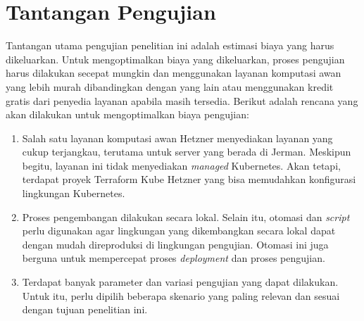 \section{Tantangan Pengujian}

Tantangan utama pengujian penelitian ini adalah estimasi biaya yang harus dikeluarkan. Untuk mengoptimalkan biaya yang dikeluarkan, proses pengujian harus dilakukan secepat mungkin dan menggunakan layanan komputasi awan yang lebih murah dibandingkan dengan yang lain atau menggunakan kredit gratis dari penyedia layanan apabila masih tersedia. Berikut adalah rencana yang akan dilakukan untuk mengoptimalkan biaya pengujian:

\begin{enumerate}
    \item Salah satu layanan komputasi awan Hetzner menyediakan layanan yang cukup terjangkau, terutama untuk server yang berada di Jerman. Meskipun begitu, layanan ini tidak menyediakan \textit{managed} Kubernetes. Akan tetapi, terdapat proyek Terraform Kube Hetzner yang bisa memudahkan konfigurasi lingkungan Kubernetes.
    \item Proses pengembangan dilakukan secara lokal. Selain itu, otomasi dan \textit{script} perlu digunakan agar lingkungan yang dikembangkan secara lokal dapat dengan mudah direproduksi di lingkungan pengujian. Otomasi ini juga berguna untuk mempercepat proses \textit{deployment} dan proses pengujian.
    \item Terdapat banyak parameter dan variasi pengujian yang dapat dilakukan. Untuk itu, perlu dipilih beberapa skenario yang paling relevan dan sesuai dengan tujuan penelitian ini.
\end{enumerate}